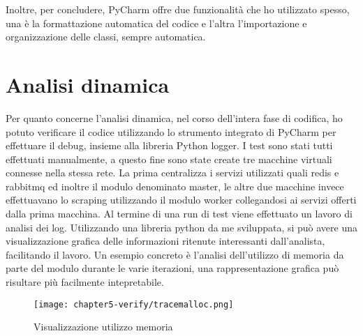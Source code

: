 Inoltre, per concludere, PyCharm offre due funzionalità che ho utilizzato spesso, una è la formattazione automatica del codice e l’altra l’importazione e organizzazione delle classi, sempre automatica.

\section{Analisi dinamica}

Per quanto concerne l’analisi dinamica, nel corso dell’intera fase di codifica, ho potuto verificare il codice utilizzando lo strumento integrato di PyCharm per effettuare il debug, insieme alla libreria Python logger. I test sono stati tutti effettuati manualmente, a questo fine sono state create tre macchine virtuali connesse nella stessa rete. La prima centralizza i servizi utilizzati quali redis e rabbitmq ed inoltre il modulo denominato master, le altre due macchine invece effettuavano lo scraping utilizzando il modulo worker collegandosi ai servizi offerti dalla prima macchina. \newline{}
Al termine di una run di test viene effettuato un lavoro di analisi dei log. Utilizzando una libreria python da me sviluppata, si può avere una visualizzazione grafica delle informazioni ritenute interessanti dall'analista, facilitando il lavoro. Un esempio concreto è l'analisi dell'utilizzo di memoria da parte del modulo durante le varie iterazioni, una rappresentazione grafica può risultare più facilmente intepretabile.

\begin{figure}[!h] 
    \centering 
    \texttt{[image: chapter5-verify/tracemalloc.png]} 
    \caption{Visualizzazione utilizzo memoria}
    \label{fig:visualizzazione-utilizzo-memoria} 
\end{figure}





